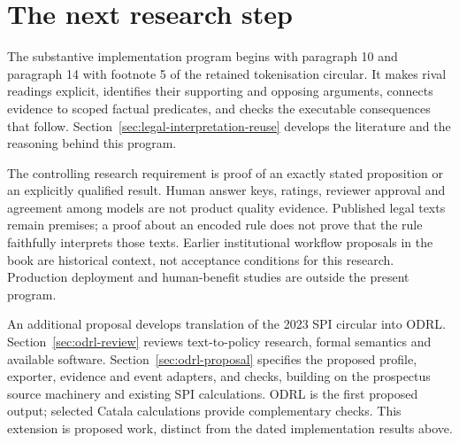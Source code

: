\documentclass[12pt,a4paper,oneside,openany]{book}
\begin{document}
\section*{The next research step}

The substantive implementation program begins with paragraph 10 and
paragraph 14 with footnote 5 of the retained tokenisation circular. It makes
rival readings explicit, identifies their supporting and opposing arguments,
connects evidence to scoped factual predicates, and checks the executable
consequences that follow. Section~\ref{sec:legal-interpretation-reuse} develops
the literature and the reasoning behind this program.

The controlling research requirement is proof of an exactly stated proposition
or an explicitly qualified result. Human answer keys, ratings, reviewer approval
and agreement among models are not product quality evidence. Published legal
texts remain premises; a proof about an encoded rule does not prove that the
rule faithfully interprets those texts. Earlier institutional workflow proposals
in the book are historical context, not acceptance conditions for this research.
Production deployment and human-benefit studies are outside the present program.

An additional proposal develops translation of the 2023 SPI circular into
ODRL. Section~\ref{sec:odrl-review} reviews text-to-policy research, formal
semantics and available software. Section~\ref{sec:odrl-proposal} specifies
the proposed profile, exporter, evidence and event adapters, and checks,
building on the prospectus source machinery and existing SPI calculations.
ODRL is the first proposed output; selected Catala calculations provide
complementary checks. This extension is proposed work, distinct from the
dated implementation results above.
\end{document}
